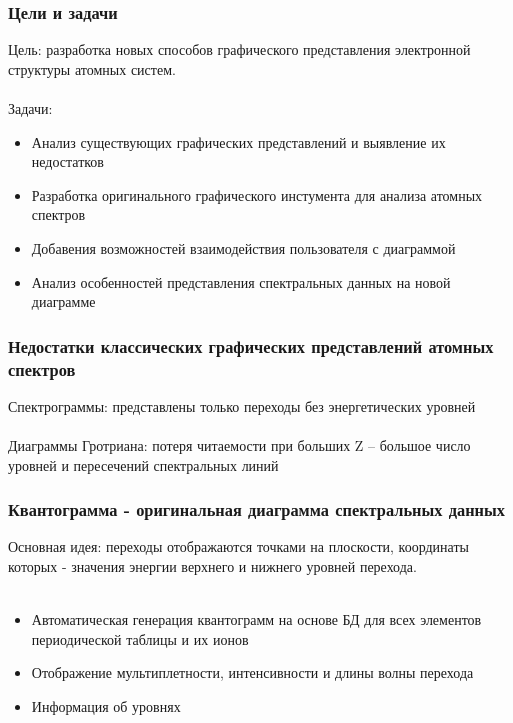 \documentclass{beamer}
\begin{document}
\begin{frame}
\frametitle{Цели и задачи}
    Цель: разработка новых способов графического представления электронной структуры атомных систем.
     \\~\\
    Задачи:
    \begin{itemize}
        \item Анализ существующих графических представлений и выявление их недостатков
        \item Разработка оригинального графического инстумента для анализа атомных спектров
        \item Добавения возможностей взаимодействия пользователя с диаграммой
        \item Анализ особенностей представления спектральных данных на новой диаграмме
    \end{itemize}
\end{frame}

\begin{frame}
\frametitle{Недостатки классических графических представлений атомных спектров}
    Спектрограммы: представлены только переходы без энергетических уровней
     \\~\\
    Диаграммы Гротриана: потеря читаемости при больших Z – большое число уровней и пересечений спектральных линий
\end{frame}

\begin{frame}
\frametitle{Квантограмма - оригинальная диаграмма спектральных данных}
    Основная идея: переходы отображаются точками на плоскости, координаты которых - значения энергии верхнего и нижнего уровней перехода.
    \\~\\
     \begin{itemize}
        \item Автоматическая генерация квантограмм на основе БД для всех элементов периодической таблицы и их ионов
        \item Отображение мультиплетности, интенсивности и длины волны перехода
        \item Информация об уровнях
    \end{itemize}
\end{frame}
\end{document}
